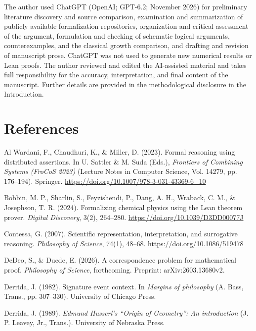 \documentclass[pdflatex,sn-apa]{sn-jnl}
\begin{document}
The author used ChatGPT (OpenAI; GPT-6.2; November 2026) for preliminary literature discovery and source comparison, examination and summarization of publicly available formalization repositories, organization and critical assessment of the argument, formulation and checking of schematic logical arguments, counterexamples, and the classical growth comparison, and drafting and revision of manuscript prose. ChatGPT was not used to generate new numerical results or Lean proofs. The author reviewed and edited the AI-assisted material and takes full responsibility for the accuracy, interpretation, and final content of the manuscript. Further details are provided in the methodological disclosure in the Introduction.

\section*{References}
\noindent Al Wardani, F., Chaudhuri, K., \& Miller, D. (2023). Formal reasoning using distributed assertions. In U. Sattler \& M. Suda (Eds.), \emph{Frontiers of Combining Systems (FroCoS 2023)} (Lecture Notes in Computer Science, Vol. 14279, pp. 176--194). Springer. \url{https://doi.org/10.1007/978-3-031-43369-6_10}\par\medskip

\noindent Bobbin, M. P., Sharlin, S., Feyzishendi, P., Dang, A. H., Wraback, C. M., \& Josephson, T. R. (2024). Formalizing chemical physics using the Lean theorem prover. \emph{Digital Discovery}, 3(2), 264--280. \url{https://doi.org/10.1039/D3DD00077J}\par\medskip

\noindent Contessa, G. (2007). Scientific representation, interpretation, and surrogative reasoning. \emph{Philosophy of Science}, 74(1), 48--68. \url{https://doi.org/10.1086/519478}\par\medskip

\noindent DeDeo, S., \& Duede, E. (2026). A correspondence problem for mathematical proof. \emph{Philosophy of Science}, forthcoming. Preprint: arXiv:2603.13680v2.\par\medskip

\noindent Derrida, J. (1982). Signature event context. In \emph{Margins of philosophy} (A. Bass, Trans., pp. 307--330). University of Chicago Press.\par\medskip
\noindent Derrida, J. (1989). \emph{Edmund Husserl's ``Origin of Geometry'': An introduction} (J. P. Leavey, Jr., Trans.). University of Nebraska Press.\par\medskip
\end{document}
